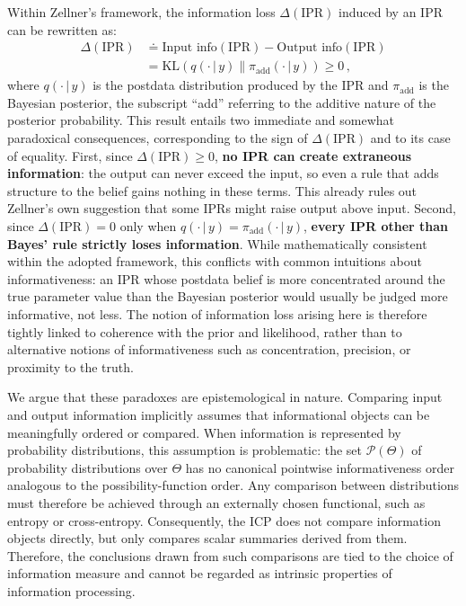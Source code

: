 \documentclass[accepted]{uai2026} %
\def\given{\,|\,}
\theoremstyle{remark}
\begin{document}
Within Zellner's framework, the information loss $\Delta(\text{IPR})$ induced by an IPR can be rewritten as:
\begin{align}
\Delta(\text{IPR}) & \doteq \text{Input info}(\text{IPR}) - \text{Output info}(\text{IPR}) \\
& = \mathrm{KL}\left(q(\cdot \given y) \| \pi_{\textrm{add}}(\cdot \given y) \right) \geq 0 \, ,
\end{align}
where $q(\cdot \given y)$ is the postdata distribution produced by the IPR and $\pi_{\mathrm{add}}$ is the Bayesian posterior, the subscript ``add'' referring to the additive nature of the posterior probability. This result entails two immediate and somewhat paradoxical consequences, corresponding to the sign of $\Delta(\text{IPR})$ and to its case of equality. First, since $\Delta(\text{IPR}) \ge 0$, \textbf{no IPR can create extraneous information}: the output can never exceed the input, so even a rule that adds structure to the belief gains nothing in these terms. This already rules out Zellner's own suggestion that some IPRs might raise output above input. Second, since $\Delta(\text{IPR}) = 0$ only when $q(\cdot \given y) = \pi_{\textrm{add}}(\cdot \given y)$, \textbf{every IPR other than Bayes' rule strictly loses information}. While mathematically consistent within the adopted framework, this conflicts with common intuitions about informativeness: an IPR whose postdata belief is more concentrated around the true parameter value than the Bayesian posterior would usually be judged more informative, not less. The notion of information loss arising here is therefore tightly linked to coherence with the prior and likelihood, rather than to alternative notions of informativeness such as concentration, precision, or proximity to the truth.

We argue that these paradoxes are epistemological in nature. Comparing input and output information implicitly assumes that informational objects can be meaningfully ordered or compared. When information is represented by probability distributions, this assumption is problematic: the set $\mathcal{P}(\Theta)$ of probability distributions over $\Theta$ has no canonical pointwise informativeness order analogous to the possibility-function order. Any comparison between distributions must therefore be achieved through an externally chosen functional, such as entropy or cross-entropy. Consequently, the ICP does not compare information objects directly, but only compares scalar summaries derived from them. Therefore, the conclusions drawn from such comparisons are tied to the choice of information measure and cannot be regarded as intrinsic properties of information processing.
\end{document}
